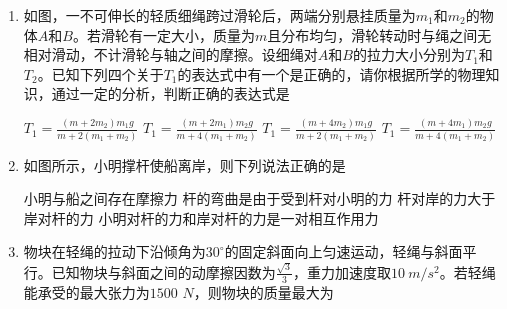 \begin{enumerate}[leftmargin=0em]
{\begin{enumerate}
\end{enumerate}


}



\item 
{}
如图，一不可伸长的轻质细绳跨过滑轮后，两端分别悬挂质量为$ m_{1} $和$ m_{2} $的物体$ A $和$ B $。若滑轮有一定大小，质量为$ m $且分布均匀，滑轮转动时与绳之间无相对滑动，不计滑轮与轴之间的摩擦。设细绳对$ A $和$ B $的拉力大小分别为$ T_{1} $和$ T_{2} $。已知下列四个关于$ T_{1} $的表达式中有一个是正确的，请你根据所学的物理知识，通过一定的分析，判断正确的表达式是  


\begin{minipage}[h!]{0.7\linewidth}
\vspace{0.3em}
\fourchoices
{$ T _ { 1 } = \frac { \left( m + 2 m _ { 2 } \right) m _ { 1 } g } { m + 2 \left( m _ { 1 } + m _ { 2 } \right) } $}
{$ T _ { 1 } = \frac { \left( m + 2 m _ { 1 } \right) m _ { 2 } g } { m + 4 \left( m _ { 1 } + m _ { 2 } \right) } $}
{$ T _ { 1 } = \frac { \left( m + 4 m _ { 2 } \right) m _ { 1 } g } { m + 2 \left( m _ { 1 } + m _ { 2 } \right) } $}
{$ T _ { 1 } = \frac { \left( m + 4 m _ { 1 } \right) m _ { 2 } g } { m + 4 \left( m _ { 1 } + m _ { 2 } \right) } $}
\vspace{0.3em}
\end{minipage}
\hfill
\begin{minipage}[h!]{0.3\linewidth}
\flushright
\vspace{0.3em}

\vspace{0.3em}
\end{minipage}



\item 
{}
如图所示，小明撑杆使船离岸，则下列说法正确的是
\begin{figure}[h!]
\centering

\end{figure}


\fourchoices
{小明与船之间存在摩擦力}
{杆的弯曲是由于受到杆对小明的力}
{杆对岸的力大于岸对杆的力}
{小明对杆的力和岸对杆的力是一对相互作用力}




\item 
{}
物块在轻绳的拉动下沿倾角为$ 30 ^{ \circ } $的固定斜面向上匀速运动，轻绳与斜面平行。已知物块与斜面之间的动摩擦因数为$ \frac{\sqrt{3}}{3} $，重力加速度取$ 10 \ m/s ^{2} $。若轻绳能承受的最大张力为$ 1500 $ $ N $，则物块的质量最大为  



\end{enumerate}
